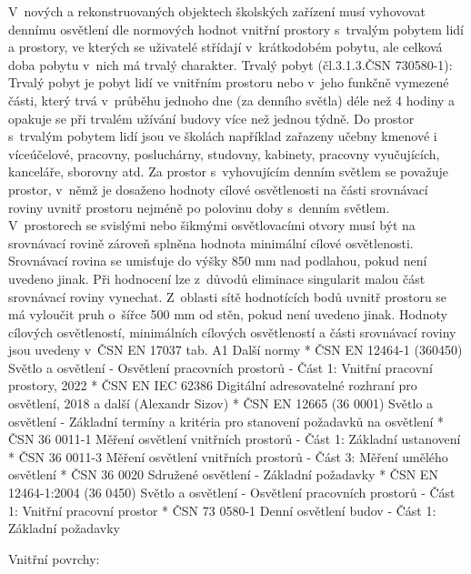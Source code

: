 V~nových a rekonstruovaných objektech školských zařízení musí vyhovovat dennímu osvětlení dle normových
hodnot vnitřní prostory s~trvalým pobytem lidí a prostory, ve kterých se uživatelé střídají v~krátkodobém pobytu,
ale celková doba pobytu v~nich má trvalý charakter.
Trvalý pobyt (čl.3.1.3.ČSN 730580-1):
\medskip
Trvalý pobyt je pobyt lidí ve vnitřním prostoru nebo v~jeho funkčně vymezené části, který trvá v~průběhu jednoho
dne (za denního světla) déle než 4 hodiny a opakuje se při trvalém užívání budovy více než jednou týdně.
\medskip
Do prostor s~trvalým pobytem lidí jsou ve školách například zařazeny učebny kmenové i víceúčelové, pracovny,
posluchárny, studovny, kabinety, pracovny vyučujících, kanceláře, sborovny atd. Za prostor s~vyhovujícím
denním světlem se považuje prostor, v~němž je dosaženo hodnoty cílové osvětlenosti na části srovnávací
roviny uvnitř prostoru nejméně po polovinu doby s~denním světlem.
\medskip
V~prostorech se svislými nebo šikmými osvětlovacími otvory musí být na srovnávací rovině zároveň splněna
hodnota minimální cílové osvětlenosti.
\medskip
Srovnávací rovina se umisťuje do výšky 850 mm nad podlahou, pokud není uvedeno jinak. Při hodnocení lze z~důvodů
eliminace singularit malou část srovnávací roviny vynechat. Z~oblasti sítě hodnotících bodů uvnitř prostoru se
má vyloučit pruh o~šířce 500 mm od stěn, pokud není uvedeno jinak.
\medskip
Hodnoty cílových osvětleností, minimálních cílových osvětleností a části srovnávací roviny jsou uvedeny v~ČSN EN 17037 tab. A1
\medskip
{\sbf Další normy}
\begitems
    * ČSN EN 12464-1 (360450) Světlo a osvětlení - Osvětlení pracovních prostorů - Část 1: Vnitřní pracovní prostory, 2022
    * ČSN EN IEC 62386 Digitální adresovatelné rozhraní pro osvětlení, 2018
      a další (Alexandr Sizov)
    * ČSN EN 12665 (36 0001) Světlo a osvětlení - Základní termíny a kritéria pro stanovení požadavků na osvětlení
    * ČSN 36 0011-1 Měření osvětlení vnitřních prostorů - Část 1: Základní ustanovení
    * ČSN 36 0011-3 Měření osvětlení vnitřních prostorů - Část 3: Měření umělého osvětlení
    * ČSN 36 0020 Sdružené osvětlení - Základní požadavky
    * ČSN EN 12464-1:2004 (36 0450) Světlo a osvětlení - Osvětlení pracovních prostorů - Část 1: Vnitřní pracovní prostor
    * ČSN 73 0580-1 Denní osvětlení budov - Část 1: Základní požadavky
\enditems

{\sbf Vnitřní povrchy:}

